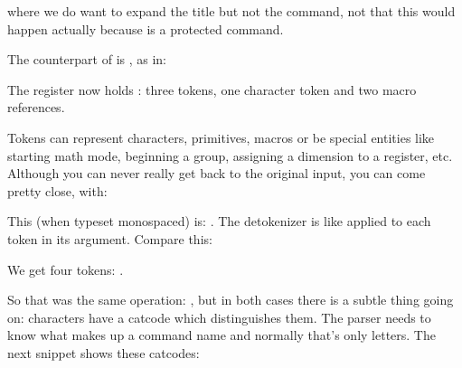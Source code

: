 where we do want to expand the title but not the \type {\chapter} command, not
that this would happen actually because \type {\chapter} is a protected command.

The counterpart of \type {\normalexpanded} is \type {\normalunexpanded}, as in:

\startbuffer
\def\MyMacroA{a}
\def\MyMacroB{b}
\normalprotected{}
\normalexpanded {\scratchtoks
    {\MyMacroA\normalunexpanded {\MyMacroB}\MyMacroC}}
\stopbuffer

\typebuffer[option=TEX] \getbuffer

The register now holds \MyShow: three tokens, one character token and two
macro references.

Tokens can represent characters, primitives, macros or be special entities like
starting math mode, beginning a group, assigning a dimension to a register, etc.
Although you can never really get back to the original input, you can come pretty
close, with:

\startbuffer
{}
\stopbuffer

\typebuffer[option=TEX]

This (when typeset monospaced) is: {\tt \inlinebuffer}. The detokenizer is like
\type {\string} applied to each token in its argument. Compare this:

\startbuffer
\normalexpanded {
    \normaldetokenize{10pt}
}
\stopbuffer

\typebuffer[option=TEX]

We get four tokens: {\tt\inlinebuffer}.

\startbuffer
{}
\stopbuffer

\typebuffer[option=TEX]

So that was the same operation: {\tt\inlinebuffer}, but in both cases there is a
subtle thing going on: characters have a catcode which distinguishes them. The
parser needs to know what makes up a command name and normally that's only
letters. The next snippet shows these catcodes:

\startbuffer
{}
\stopbuffer

